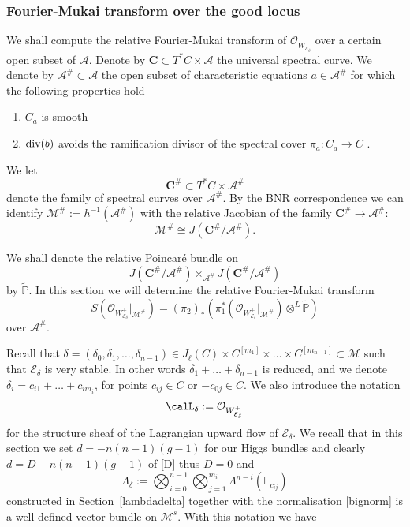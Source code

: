 \documentclass[12pt]{article}
\numberwithin{equation}{section}
\renewcommand{\div}{{\rm div}}
\theoremstyle{remark}
\theoremstyle{definition}
\numberwithin{theorem}{section}
\def\bP{{\mathbb P}}
\def\calE{{\mathcal E}}
\def\bE{{\mathbb{E}}}
\def\M{{\mathcal{M}}}
\def\calA{{\mathcal{A}}}
\def\calO{{\mathcal O}}
\def\d{{{\delta}}}
\renewcommand{\1}{\mathbbm{1}}
\begin{document}
\subsubsection{Fourier-Mukai transform over the good locus}

We shall compute the relative Fourier-Mukai transform of $\calO_{W_{\calE_\delta}^+}$ over a certain open subset of $\calA$. Denote by $\mathbf{C}\subset T^*C\times \calA$ the universal spectral curve. 
We denote by $\calA^{\#}\subset \calA$ the open subset of characteristic equations $a\in\calA^{\#}$ for which the following  properties hold \begin{enumerate} \item $C_a$ is smooth \item $\div(b)$ avoids the ramification divisor of the spectral cover $\pi_a:C_a\to C$  %
	.\end{enumerate} We let $$\mathbf{C}^{\#}\subset T^*C\times \calA^{\#}$$ denote the family of spectral curves over $\calA^{\#}$. By the BNR correspondence we can identify $\M^{\#}:=h^{-1}(\calA^{\#})$ with the relative Jacobian of the family $\mathbf{C}^{\#}\to \calA^{\#}$: $$\M^{\#}\cong J({\mathbf{C}}^{\#}/{\calA}^{\#}).$$

We shall denote the relative Poincar\'e bundle on
$$J({\mathbf{C}}^{\#}/{\calA}^{\#})\times_{\calA^{\#}} J({\mathbf{C}}^{\#}/{\calA}^{\#})$$
by $\tilde{\bP}$. 
In this section
we will determine the relative Fourier-Mukai transform $$S(\calO_{W_{\calE_\delta}^+}|_{\M^\#})=(\pi_2)_*(\pi_1^*(\calO_{W_{\calE_\delta}^+}|_{\M^\#})\otimes^L \tilde{\bP})$$ over $\calA^{\#}$.

Recall that $\delta=(\delta_0,\delta_1,\dots,\delta_{n-1}) \in J_\ell(C)\times C^{[m_1]}\times \dots \times C^{[m_{n-1}]}\subset \M$ such that $\calE_{\d}$ is very stable. In other words $\delta_1+\dots + \delta_{n-1}$ is reduced, and we denote $\delta_i=c_{i1}+\dots+c_{im_i}$, for points $c_{ij}\in C$ or $-c_{0j}\in C$.  We also introduce the notation $$\calL_{\d}:=\calO_{W^+_{\calE_{\d}}}$$ for the structure sheaf of the Lagrangian upward flow of $\calE_{\d}$. We recall that in this section we set $d=-n(n-1)(g-1)$ for our Higgs bundles and clearly $d=D-n(n-1)(g-1)$ of \eqref{D} thus $D=0$ and 
$$\Lambda_{\d}:= \bigotimes_{i=0}^{n-1}\bigotimes_{j=1}^{m_i} \Lambda^{n-i}(\bE_{c_{ij}})$$ constructed in Section~\ref{lambdadelta} together with the normalisation \eqref{bignorm} is  a well-defined vector bundle on $\M^s$. With this notation we have
\end{document}
